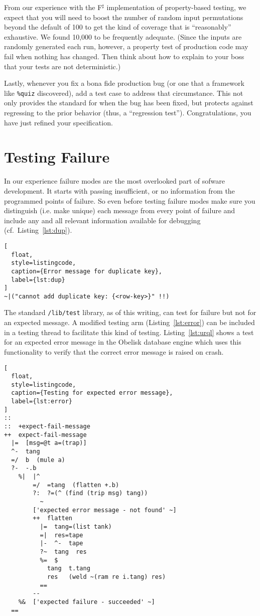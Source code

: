 \documentclass[twoside]{article}
\begin{document}
From our experience with the F{$^\sharp$} implementation of pro\-perty-based testing, we expect that you will need to boost the number of random input permutations beyond the default of 100 to get the kind of coverage that is ``reasonably'' exhaustive. We found 10,000 to be frequently adequate. (Since the inputs are randomly generated each run, however, a property test of production code may fail when nothing has changed. Then think about how to explain to your boss that your tests are not deterministic.)

Lastly, whenever you fix a bona fide production bug (or one that a framework like \lstinline[style=inlinecode]{%quiz} discovered), add a test case to address that circumstance. This not only provides the standard for when the bug has been fixed, but protects against regressing to the prior behavior (thus, a ``regression test''). Congratulations, you have just refined your specification.

\section{Testing Failure}

In our experience failure modes are the most overlooked part of sofware development. It starts with passing insufficient, or no information from the programmed points of failure. So even before testing failure modes make sure you distinguish (i.e. make unique) each message from every point of failure and include any and all relevant information available for debugging (cf.\ Listing~\ref{lst:dup}).

\begin{lstlisting}[
  float,
  style=listingcode,
  caption={Error message for duplicate key},
  label={lst:dup}
]
~|("cannot add duplicate key: {<row-key>}" !!)
\end{lstlisting}

\newpage
The standard \lstinline[style=inlinecode]{/lib/test} library, as of this writing, can test for failure but not for an expected message.  A modified testing arm (Listing~\ref{lst:error}) can be included in a testing thread to facilitate this kind of testing.  Listing~\ref{lst:urql} shows a test for an expected error message in the Obelisk database engine which uses this functionality to verify that the correct error message is raised on crash.

\begin{lstlisting}[
  float,
  style=listingcode,
  caption={Testing for expected error message},
  label={lst:error}
]
::
::  +expect-fail-message
++  expect-fail-message
  |=  [msg=@t a=(trap)]
  ^-  tang
  =/  b  (mule a)
  ?-  -.b
    %|  |^
        =/  =tang  (flatten +.b)
        ?:  ?=(^ (find (trip msg) tang))
          ~
        ['expected error message - not found' ~]
        ++  flatten
          |=  tang=(list tank)
          =|  res=tape
          |-  ^-  tape
          ?~  tang  res
          %=  $
            tang  t.tang
            res   (weld ~(ram re i.tang) res)
          ==
        --
    %&  ['expected failure - succeeded' ~]
  ==
\end{lstlisting}
\end{document}
